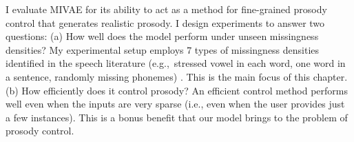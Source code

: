 \documentclass[../thesis.tex]{subfiles}
\begin{document}
I evaluate MIVAE for its ability to act as a method for fine-grained prosody control that generates realistic prosody. I design experiments to answer two questions: (a) How well does the model perform under unseen missingness densities? My experimental setup employs 7 types of missingness densities identified in the speech literature (e.g.,\ stressed vowel in each word, one word in a sentence, randomly missing phonemes) \citep{wagnerExperimentalTheoreticalAdvances2010}. This is the main focus of this chapter. (b) How efficiently does it control prosody? An efficient control method performs well even when the inputs are very sparse (i.e., even when the user provides just a few instances). This is a bonus benefit that our model brings to the problem of prosody control.


\end{document}
